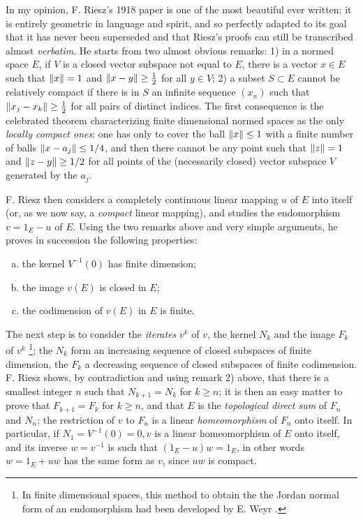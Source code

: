 \documentclass[12pt,a4paper,leqno,twoside]{extbook}
\DeclarePairedDelimiter{\norm}{\lVert}{\rVert}
\begin{document}
In my opinion, F. Riesz's 1918 paper is one of the most beautiful ever written; it is entirely geometric in language and spirit, and so perfectly adapted to its goal that it has never been superseded and that Riesz's proofs can still be transcribed almost \emph{verbatim}. He starts from two almost obvious remarks: 1) in a normed space \(E\), if \(V\) is a closed vector subspace not equal to \(E\), there is a vector \(x \in E\) such that \(\norm{x} = 1\) and \(\norm{x-y} \geq \frac{1}{2}\) for all \(y \in V\); 2) a subset \(S \subset E\) cannot be relatively compact if there is in \(S\) an infinite sequence \((x_n)\) such that \(\norm{x_j-x_k} \geq \frac{1}{2}\) for all pairs of distinct indices. The first consequence is the celebrated theorem characterizing finite dimensional normed spaces as the only \emph{locally compact ones}: one has only to cover the ball \(\norm{x} \leq 1\) with a finite number of balls \(\norm{x-a_j} \leq 1/4\), and then there cannot be any point such that \(\norm{z} = 1\) and \(\norm{z - y} \geq 1/2\) for all points of the (necessarily closed) vector subspace \(V\) generated by the \(a_j\).

F. Riesz then considers a completely continuous linear mapping \(u\) of \(E\) into itself (or, as we now say, a \emph{compact} linear mapping), and studies the endomorphism \(v = 1_E - u\) of \(E\). Using the two remarks above and very simple arguments, he proves in succession the following properties:
\begin{enumerate}[a),noitemsep]
    \item the kernel \(V^{-1}(0)\) has finite dimension;

    \item the image \(v(E)\) is closed in \(E\);

    \item the codimension of \(v(E)\) in \(E\) is finite.
\end{enumerate}
The next step is to consider the \emph{iterates} \(v^k\) of \(v\), the kernel \(N_k\) and the image \(F_k\) of \(v^k\) \footnote{In finite dimensional spaces, this method to obtain the the Jordan normal form of an endomorphism had been developed by E. Weyr \cite{228}.}; the \(N_k\) form an increasing sequence of closed subspaces of finite dimension, the \(F_k\) a decreasing sequence of closed subspaces of finite codimension. F. Riesz shows, by contradiction and using remark 2) above, that there is a smallest integer \(n\) such that \(N_{k+1} = N_k\) for \(k \geq n\); it is then an easy matter to prove that \(F_{k+1} = F_k\) for \(k \geq n\), and that \(E\) is the \emph{topological direct sum} of \(F_n\) and \(N_n\); the restriction of \(v\) to \(F_n\) is a linear \emph{homeomorphism} of \(F_n\) onto itself. In particular, if \(N_1 = V^{-1}(0) = {0}, v\) is a linear homeomorphism of \(E\) onto itself, and its inverse \(w = v^{-1}\) is such that \((1_E - u) w = 1_E\), in other words \(w = 1_E + uw\) has the same form as \(v\), since \(uw\) is compact.
\end{document}

